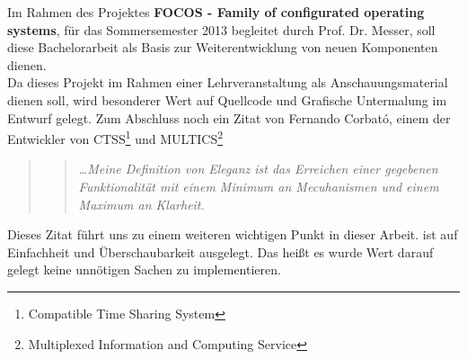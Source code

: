 Im Rahmen des Projektes \textbf{FOCOS - Family of configurated operating systems}, f\"ur das Sommersemester 2013 begleitet durch Prof. Dr. Messer, soll diese Bachelorarbeit als Basis zur Weiterentwicklung von neuen Komponenten dienen.\\
Da dieses Projekt im Rahmen einer Lehrveranstaltung als Anschauungsmaterial dienen soll, wird besonderer Wert auf Quellcode und Grafische Untermalung im Entwurf gelegt. Zum Abschluss noch ein Zitat von Fernando Corbat\'o, einem der Entwickler von CTSS\footnote{Compatible Time Sharing System} und MULTICS\footnote{Multiplexed Information and Computing Service}
\begin{quote}
\blockquote{\textit{\ldots Meine Definition von Eleganz ist das Erreichen einer gegebenen Funktionalit\"at mit einem Minimum an Mecuhanismen und einem Maximum an Klarheit.}}\parencite[915]{os}
\end{quote}
Dieses Zitat f\"uhrt uns zu einem weiteren wichtigen Punkt in dieser Arbeit. \mops ist auf Einfachheit und \"Uberschaubarkeit ausgelegt. Das hei\ss t es wurde Wert darauf gelegt keine unn\"otigen Sachen zu implementieren.